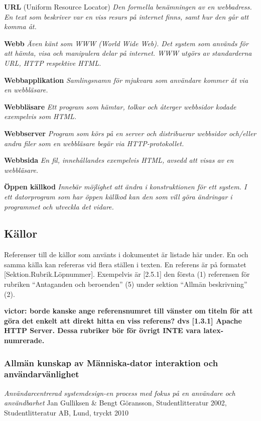 \documentclass[a4paper, twoside, 11pt, titlepage]{article}
\begin{document}
	\textbf{URL} (Uniform Resource Locator) \emph{Den formella benämningen av en webbadress. En text som beskriver var en viss resurs på internet finns, samt hur den går att komma åt.}

	\textbf{Webb} \emph{Även känt som WWW (World Wide Web). Det system som används för att hämta, visa och manipulera delar på internet. WWW utgörs av standarderna URL, HTTP respektive HTML.}

	\textbf{Webbapplikation} \emph{Samlingsnamn för mjukvara som användare kommer åt via en webbläsare.}

	\textbf{Webbläsare} \emph{Ett program som hämtar, tolkar och återger webbsidor kodade exempelvis som HTML.}

	\textbf{Webbserver} \emph{Program som körs på en server och distribuerar webbsidor och/eller andra filer som en webbläsare begär via HTTP-protokollet.}

	\textbf{Webbsida} \emph{En fil, innehållandes exempelvis HTML, avsedd att visas av en webbläsare.}

	\textbf{Öppen källkod} \emph{Innebär möjlighet att ändra i konstruktionen för ett system. I ett datorprogram som har öppen källkod kan den som vill göra ändringar i programmet och utveckla det vidare.}

	\subsection{Källor}


	Referenser till de källor som använts i dokumentet är listade här under. En och samma källa kan refereras vid flera ställen i texten. En referens är på formatet [Sektion.Rubrik.Löpnummer]. Exempelvis är [2.5.1] den första (1) referensen för rubriken ``Antaganden och beroenden'' (5) under sektion ``Allmän beskrivning'' (2).

	\textbf{victor: borde kanske ange referensnumret till vänster om titeln för att göra det enkelt att direkt hitta en viss referens? dvs [1.3.1] Apache HTTP Server. Dessa rubriker bör för övrigt INTE vara latex-numrerade.}

		\subsubsection{Allmän kunskap av Människa-dator interaktion och användarvänlighet}


		\emph{Användarcentrerad systemdesign-en process med fokus på en användare och användbarhet} Jan Gulliksen \& Bengt Göransson, Studentlitteratur 2002, Studentlitteratur AB, Lund, tryckt 2010
\end{document}
